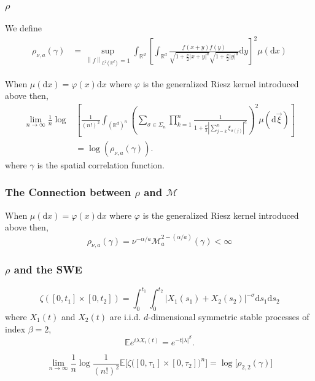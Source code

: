 \documentclass{beamer}
\numberwithin{equation}{section}
\newcommand{\R}{\mathbb{R}}
\newcommand{\Norm}[1]{\left\|  #1   \right\|}
\newcommand{\ud}{\ensuremath{\mathrm{d}}}
\begin{document}
		\begin{frame}[t]
		\frametitle{$\rho$}
		We define 
					\begin{align*}
			\rho_{\nu,a}(\gamma) &= \sup_{\Norm{f}_{L^2(\R^d)} =1} \int_{\R^d} \left[ \int_{\R^d} \frac{f(x+y)f(y)}{\sqrt{1+\frac{\nu}{2}|x+y|^a } \sqrt{1+\frac{\nu}{2}|y|^a} } \ud y \right]^2 \mu(\ud x)
			\end{align*}
			
		\begin{theorem}
			When $\mu(\ud x) = \varphi(x) \ud x$ where $\varphi$ is the generalized Riesz kernel introduced above then, 
			\begin{align*}
			\lim_{n \to \infty} \frac{1}{n} \log & \left[ \frac{1}{(n!)^2} \int_{(\R^d)^n} \left( \sum_{\sigma \in \Sigma_n} \prod_{k=1}^n \frac{1}{1+ \frac{\nu}{2}|\sum_{j=k}^n \xi_{\sigma(j)}|^a}\right)^2 \mu (\ud \vec{\xi})\right]
			\\& = \log\left( \rho_{\nu, a}\left(\gamma\right) \right).
			\end{align*}
			where $\gamma$ is the spatial correlation function. 
		\end{theorem}	
		
	\end{frame}
	
	\begin{frame}
		\frametitle{The Connection between $\rho$ and $\mathcal{M}$}
					\begin{theorem}
				When $\mu(\ud x) = \varphi(x) \ud x$ where $\varphi$ is the generalized Riesz kernel introduced above then, 
				\[
				\rho_{\nu,a}(\gamma) = \nu^{-\alpha/a} \mathcal{M}_a^{2-(\alpha / a)}(\gamma)<\infty
				\]
			\end{theorem}
	\end{frame}
	
	\begin{frame}[t]
	\frametitle{$\rho$ and the SWE}
	\[
	\zeta\left([0,t_1]\times [0,t_2]\right) = \int_0^{t_1} \int_0^{t_2} | X_1(s_1) + X_2(s_2)|^{-\sigma} \ud s_1 \ud s_2
	\]
	where $X_1(t)$ and $X_2(t)$ are i.i.d. $d$-dimensional symmetric stable processes of index $ \beta = 2$, 
	\[
	\mathbb{E}e^{i\lambda X_i(t)} = e^{-t|\lambda|^\beta}.
	\]

\begin{theorem}[X. Chen]
	\[
		\lim_{n \to \infty} \frac{1}{n} \log \frac{1}{(n!)^2} 	\mathbb{E}\bigg[ \zeta \big( [0,\tau_1] \times [0,\tau_2] \big)^n \bigg] = \log\big[\rho_{2,2}(\gamma)\big]
	\]
\end{theorem}
	\end{frame}
\end{document}
